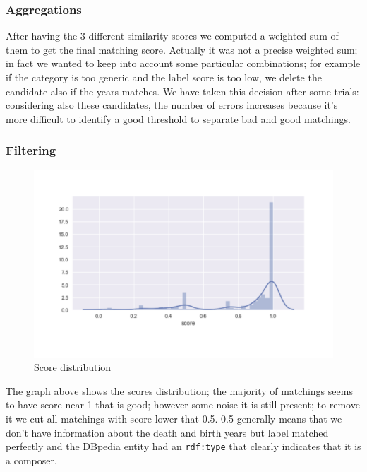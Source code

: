 \documentclass[paper=a4, fontsize=11pt]{scrartcl}
\begin{document}
\begin{enumerate}
\end{enumerate}

\subsubsection{Aggregations}

After having the 3 different similarity scores we computed a weighted sum of them  to get the final matching score. Actually it was not a precise weighted sum; in fact we wanted to keep into account some particular combinations; for example if the category is too generic and the label score is too low, we delete the candidate also if the years matches. We have taken this decision after some trials: considering also these candidates, the number of errors increases because it's more difficult to identify a good threshold to separate bad and good matchings.

\subsubsection{Filtering}

\begin{figure}[!htb]
  \centering
    \includegraphics[width=1\textwidth]{images/score_distribution.jpg}
    \caption{Score distribution}
\end{figure}

The graph above shows the scores distribution; the majority of matchings seems to have score near 1 that is good; however some noise it is still present; to remove it we cut all matchings with score lower that 0.5. 0.5 generally means that we don't have information about the death and birth years but label matched perfectly and the DBpedia entity had an \verb|rdf:type| that clearly indicates that it is a composer.
\end{document}
